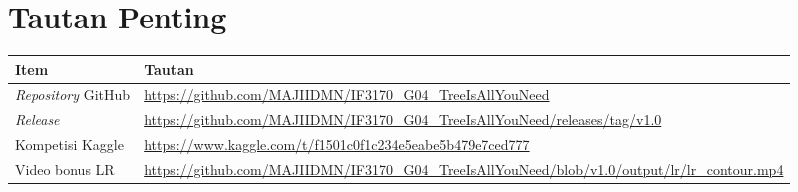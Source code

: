 \chapter{Tautan Penting}
\label{app:tautan}

\begin{table}[H]
	\centering
	\begin{tabularx}{\textwidth}{l Y}
		\toprule
		\textbf{Item} & \textbf{Tautan} \\
		\midrule
		\textit{Repository} GitHub & \url{https://github.com/MAJIIDMN/IF3170_G04_TreeIsAllYouNeed} \\
		\textit{Release} & \url{https://github.com/MAJIIDMN/IF3170_G04_TreeIsAllYouNeed/releases/tag/v1.0} \\
		Kompetisi Kaggle & \url{https://www.kaggle.com/t/f1501c0f1c234e5eabe5b479e7ced777} \\
		Video bonus LR & \url{https://github.com/MAJIIDMN/IF3170_G04_TreeIsAllYouNeed/blob/v1.0/output/lr/lr_contour.mp4} \\
		\bottomrule
	\end{tabularx}
\end{table}
